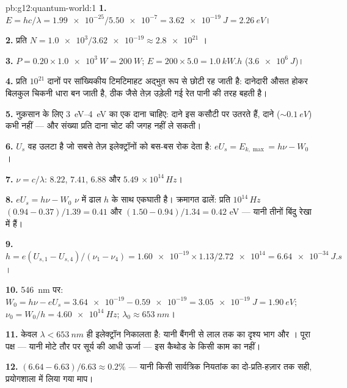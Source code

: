 \begin{solution}{pb:g12:quantum-world:1}
\textbf{1.} $E = hc/\lambda = \num{1.99e-25}/\num{5.50e-7} =
\qty{3.62e-19}{J} = \qty{2.26}{eV}$।

\textbf{2.} प्रति  $N = \num{1.0e3}/\num{3.62e-19} \approx \num{2.8e21}$ ।

\textbf{3.} $P = 0.20 \times \qty{1.0e3}{W} = \qty{200}{W}$; $E = 200 \times 5.0 = \qty{1.0}{kW.h}$ ($\qty{3.6e6}{J}$)।

\textbf{4.} प्रति  $10^{21}$ दानों पर सांख्यिकीय टिमटिमाहट अद्भुत रूप से
छोटी रह जाती है: दानेदारी औसत होकर बिलकुल चिकनी धारा बन जाती है, ठीक जैसे तेज़
उड़ेली गई रेत पानी की तरह बहती है।

\textbf{5.} नुक़सान के लिए \qtyrange{3}{4}{eV} का एक दाना चाहिए:
 दाने इस कसौटी पर उतरते हैं,  दाने ($\sim \qty{0.1}{eV}$)
कभी नहीं --- और संख्या प्रति दाना चोट की जगह नहीं ले सकती।

\textbf{6.} $U_s$ वह उलटा  है जो सबसे तेज़ इलेक्ट्रॉनों को
बस-बस रोक देता है: $eU_s = E_{k,\max} = h\nu - W_0$।

\textbf{7.} $\nu = c/\lambda$: $8.22$, $7.41$, $6.88$ और $5.49$ $\times\,10^{14}\,\unit{Hz}$।

\textbf{8.} $eU_s = h\nu - W_0$ $\nu$ में ढाल $h$ के साथ एकघाती है। क्रमागत ढालें:
प्रति $10^{14}\,\unit{Hz}$ $(0.94 - 0.37)/1.39 = 0.41$ और $(1.50 - 0.94)/1.34 = 0.42$ \unit{eV} --- यानी तीनों बिंदु रेखा में हैं।

\textbf{9.} $h = e(U_{s,1}-U_{s,4})/(\nu_1-\nu_4) = \num{1.60e-19}
\times 1.13/\num{2.72e14} = \qty{6.64e-34}{J.s}$।

\textbf{10.} \qty{546}{nm} पर: $W_0 = h\nu - eU_s = \num{3.64e-19} -
\num{0.59e-19} = \qty{3.05e-19}{J} = \qty{1.90}{eV}$; $\nu_0 = W_0/h = \qty{4.60e14}{Hz}$; $\lambda_0 \approx \qty{653}{nm}$।

\textbf{11.} केवल $\lambda < \qty{653}{nm}$ ही इलेक्ट्रॉन निकालता है: यानी बैंगनी से लाल तक का
दृश्य भाग और । पूरा  पक्ष --- यानी मोटे तौर पर
सूर्य की आधी ऊर्जा --- इस कैथोड के किसी काम का नहीं।

\textbf{12.} $(6.64 - 6.63)/6.63 \approx 0.2\%$ --- यानी किसी सार्वत्रिक नियतांक का दो-प्रति-हज़ार तक सही,
प्रयोगशाला में लिया गया माप।


\end{solution}
